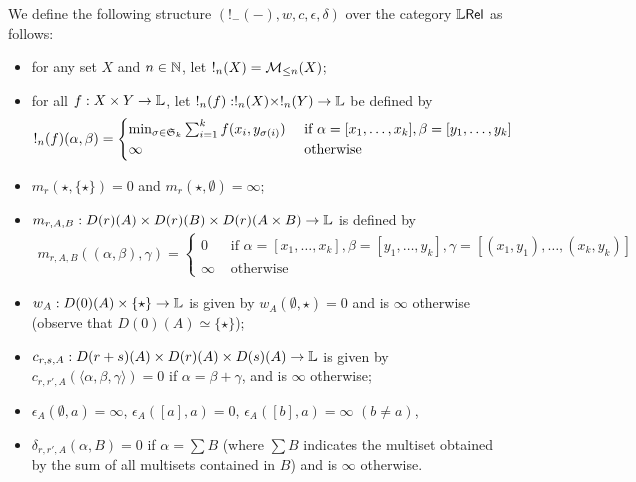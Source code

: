 \begin{definition}
We define the following structure $(!_{-}(-),w,c,\epsilon,\delta)$ over the category $\mathbb{L} \mathsf{Rel}$ as follows:
\begin{itemize}
\item for any set $X$ and $n\in \mathbb{N}$, let $!_{n}(X)=\mathcal{M}_{\leq n}(X)$;

\item for all $f: X\times Y\to \mathbb{L}$, let $!_{n}(f): !_{n}(X)\times !_{n}(Y)\to \mathbb{L}$ be defined by 
\begin{align*}
!_{n}(f)(\alpha,\beta)=
\begin{cases}
\min_{\sigma\in \mathfrak{S}_{k}}\sum_{i=1}^{k}f(x_{i},y_{\sigma(i)}) & 
\text{ if }\alpha=[x_{1},\dots, x_{k}], \beta=[y_{1},\dots, y_{k}]\\
\infty & \text{ otherwise}
\end{cases}
\end{align*}


\item $m_{r}(\star, \{\star\})=0$ and $m_{r}(\star, \emptyset)=\infty$;

\item $m_{r,A,B}: D(r)(A)\times D(r)(B)\times D(r)(A\times B)\to \mathbb{L}$ is defined by 
\begin{align*}
m_{r,A,B}((\alpha,\beta), \gamma)=
\begin{cases}
0 & \text{ if } \alpha=[x_{1},\dots, x_{k}], \beta=[y_{1},\dots, y_{k}], \gamma= [(x_{1},y_{1}),\dots, (x_{k},y_{k})]\\
\infty & \text{ otherwise}
\end{cases}
\end{align*}

\item $w_{A}:D(0)(A)\times \{\star\}\to \mathbb{L}$ is given by $w_{A}(\emptyset, \star)=0$ and is $\infty$ otherwise (observe that $D(0)(A)\simeq \{\star\}$);

\item $c_{r,s,A}: D(r+s)(A)\times D(r)(A)\times D(s)(A)\to \mathbb{L}$ is given by $c_{r,r',A}(\langle\alpha, \beta,\gamma\rangle)=0$ if $\alpha=\beta+\gamma$, and is $\infty$ otherwise;

\item $\epsilon_{A}(\emptyset, a)=\infty$, $\epsilon_{A}([a],a)=0$, $\epsilon_{A}([b],a)=\infty$ $(b\neq a)$,

\item $\delta_{r,r',A}(\alpha, B)=0$ if $\alpha= \sum B$ (where $\sum B$ indicates the multiset obtained by the sum of all multisets contained in $B$) and is $\infty$ otherwise.




\end{itemize}

\end{definition}

